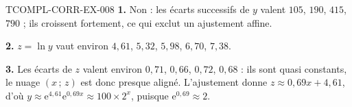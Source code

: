 \begin{corrige}{TCOMPL-CORR-EX-008}
\textbf{1.} Non : les écarts successifs de $y$ valent $105$, $190$, $415$,
$790$ ; ils croissent fortement, ce qui exclut un ajustement affine.

\textbf{2.} $z=\ln y$ vaut environ $4{,}61$, $5{,}32$, $5{,}98$, $6{,}70$,
$7{,}38$.

\textbf{3.} Les écarts de $z$ valent environ $0{,}71$, $0{,}66$, $0{,}72$,
$0{,}68$ : ils sont quasi constants, le nuage $(x\,;\,z)$ est donc presque
aligné. L'ajustement donne $z\approx0{,}69x+4{,}61$, d'où
$y\approx\mathrm{e}^{4{,}61}\mathrm{e}^{0{,}69x}\approx100\times2^{x}$,
puisque $\mathrm{e}^{0{,}69}\approx2$.
\end{corrige}
